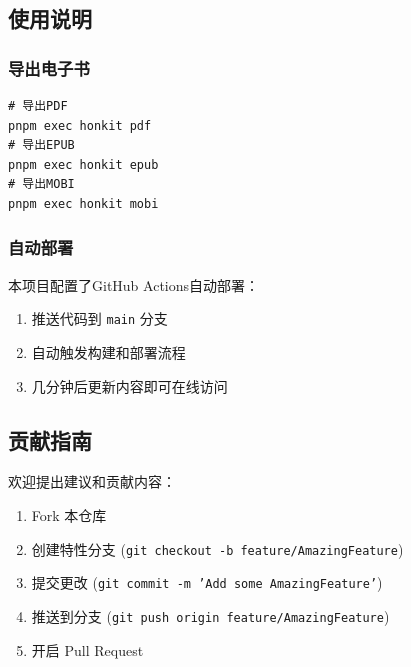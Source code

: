 \subsection{使用说明}\label{ux4f7fux7528ux8bf4ux660e} \subsubsection{导出电子书}\label{ux5bfcux51faux7535ux5b50ux4e66}
\begin{lstlisting}
# 导出PDF 
pnpm exec honkit pdf 
# 导出EPUB 
pnpm exec honkit epub 
# 导出MOBI 
pnpm exec honkit mobi 
\end{lstlisting} \subsubsection{自动部署}\label{ux81eaux52a8ux90e8ux7f72} 本项目配置了GitHub Actions自动部署： \begin{enumerate}
\def\labelenumi{\arabic{enumi}.} \tightlist \item 推送代码到 \texttt{main} 分支 \item 自动触发构建和部署流程 \item 几分钟后更新内容即可在线访问
\end{enumerate} \subsection{贡献指南}\label{ux8d21ux732eux6307ux5357} 欢迎提出建议和贡献内容： \begin{enumerate}
\def\labelenumi{\arabic{enumi}.} \tightlist \item Fork 本仓库 \item 创建特性分支 (\texttt{git checkout -b
feature/AmazingFeature}) \item 提交更改 (\texttt{git commit -m 'Add some AmazingFeature'}) \item 推送到分支 (\texttt{git push
origin feature/AmazingFeature}) \item 开启 Pull Request \end{enumerate}
